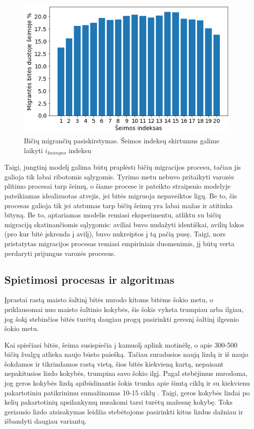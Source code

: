 \documentclass{VUMIFPSmagistrinis}
\begin{document}
\begin{figure}[H]
    \centering
    \includegraphics[scale=0.7]{img/new/emi.png}
    \caption{Bičių migrančių pasiskirstymas. Šeimos indeksų skirtumus galime laikyti $i_{kaimyno}$ indeksu}
    \label{pavem}
\end{figure}


Taigi, jungtinį modelį galima būtų praplėsti bičių migracijos procesu, tačiau jis galioja tik labai ribotomis sąlygomis. Tyrimo metu nebuvo pritaikyti varozės plitimo procesai tarp šeimų, o šiame procese ir pateikto straipsnio \cite{BPC16} modelyje pateikiamas idealizuotas atvejis, jei bitės migruoja nepaveiktos ligų. Be to, šis procesas galioja tik jei atstumas tarp bičių šeimų yra labai mažas ir atitinka bityną. Be to, aptariamas modelis remiasi eksperimentu, atliktu su bičių migraciją skatinančiomis sąlygomis: aviliai buvo nudažyti identiškai, avilių lakos (pro kur bitė įskrenda į avilį), buvo nukreiptos į tą pačią pusę. Taigi, nors pristatytas migracijos procesas remiasi empiriniais duomenimis, jį būtų verta perdaryti prijungus varozės procesus.


\subsection{Spietimosi procesas ir algoritmas}

 Įprastai rastą maisto šaltinį bitės nurodo kitoms bitėms šokio metu, o priklausomai nuo maisto šaltinio kokybės, šis šokis vyksta trumpiau arba ilgiau, jog šokį stebinčios bitės turėtų daugiau progų pasirinkti geresnį šaltinį ilgesnio šokio metu. 
 
 Kai spiečiasi bitės, šeima susispiečia į kamuolį aplink motinėlę, o apie 300-500 bičių žvalgų atlieka naujo būsto paiešką. Tačiau suradusios naują lizdą ir iš naujo šokdamos ir tikrindamos rastą vietą, šios bitės kiekvieną kartą, nepaisant nepakitusios lizdo kokybės, trumpina savo šokio ilgį. Pagal stebėjimus nurodoma, jog geros kokybės lizdą apibūdinantis šokis trunka apie šimtą ciklų ir su kiekvienu pakartotiniu patikrinimu sumažinamas 10-15 ciklų \cite{See10}. Taigi, geros kokybės lizdai po kelių pakartotinių apsilankymų nusakomi tarsi turėtų mažesnę kokybę. Toks geriausio lizdo atsisakymas leidžia stebėtojoms pasirinkti kitus lizdus dažniau ir išbandyti daugiau variantų. 
 
\end{document}
